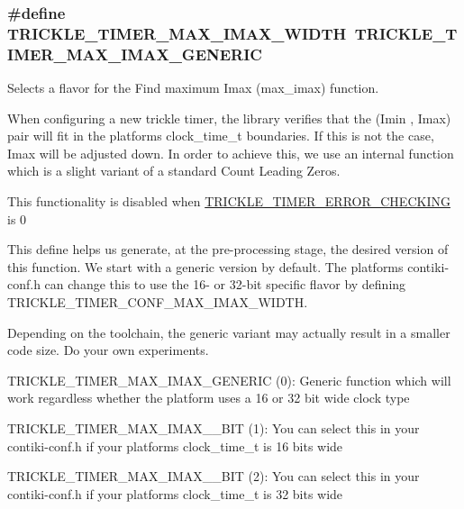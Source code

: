 \subsubsection[{T\+R\+I\+C\+K\+L\+E\+\_\+\+T\+I\+M\+E\+R\+\_\+\+M\+A\+X\+\_\+\+I\+M\+A\+X\+\_\+\+W\+I\+D\+T\+H}]{\setlength{\rightskip}{0pt plus 5cm}\#define T\+R\+I\+C\+K\+L\+E\+\_\+\+T\+I\+M\+E\+R\+\_\+\+M\+A\+X\+\_\+\+I\+M\+A\+X\+\_\+\+W\+I\+D\+T\+H~{\bf T\+R\+I\+C\+K\+L\+E\+\_\+\+T\+I\+M\+E\+R\+\_\+\+M\+A\+X\+\_\+\+I\+M\+A\+X\+\_\+\+G\+E\+N\+E\+R\+I\+C}}\label{group__trickle-timer_ga157285503882e567c275871fd30d3016}


Selects a flavor for the \textquotesingle{}Find maximum Imax\textquotesingle{} (max\+\_\+imax) function. 

When configuring a new trickle timer, the library verifies that the (Imin , Imax) pair will fit in the platform\textquotesingle{}s clock\+\_\+time\+\_\+t boundaries. If this is not the case, Imax will be adjusted down. In order to achieve this, we use an internal function which is a slight variant of a standard \textquotesingle{}Count Leading Zeros\textquotesingle{}.

This functionality is disabled when \hyperlink{group__trickle-timer_gad47a05440295b6f171873f5f43384e56}{T\+R\+I\+C\+K\+L\+E\+\_\+\+T\+I\+M\+E\+R\+\_\+\+E\+R\+R\+O\+R\+\_\+\+C\+H\+E\+C\+K\+I\+N\+G} is 0

This define helps us generate, at the pre-\/processing stage, the desired version of this function. We start with a generic version by default. The platform\textquotesingle{}s contiki-\/conf.\+h can change this to use the 16-\/ or 32-\/bit specific flavor by defining T\+R\+I\+C\+K\+L\+E\+\_\+\+T\+I\+M\+E\+R\+\_\+\+C\+O\+N\+F\+\_\+\+M\+A\+X\+\_\+\+I\+M\+A\+X\+\_\+\+W\+I\+D\+T\+H.

Depending on the toolchain, the generic variant may actually result in a smaller code size. Do your own experiments.

T\+R\+I\+C\+K\+L\+E\+\_\+\+T\+I\+M\+E\+R\+\_\+\+M\+A\+X\+\_\+\+I\+M\+A\+X\+\_\+\+G\+E\+N\+E\+R\+I\+C (0)\+: Generic function which will work regardless whether the platform uses a 16 or 32 bit wide clock type

T\+R\+I\+C\+K\+L\+E\+\_\+\+T\+I\+M\+E\+R\+\_\+\+M\+A\+X\+\_\+\+I\+M\+A\+X\+\_\+\_\+\+B\+I\+T (1)\+: You can select this in your contiki-\/conf.\+h if your platform\textquotesingle{}s clock\+\_\+time\+\_\+t is 16 bits wide

T\+R\+I\+C\+K\+L\+E\+\_\+\+T\+I\+M\+E\+R\+\_\+\+M\+A\+X\+\_\+\+I\+M\+A\+X\+\_\+\_\+\+B\+I\+T (2)\+: You can select this in your contiki-\/conf.\+h if your platform\textquotesingle{}s clock\+\_\+time\+\_\+t is 32 bits wide \hypertarget{group__trickle-timer_ga2b39325309fb89efa3b965437a249bef}{}
